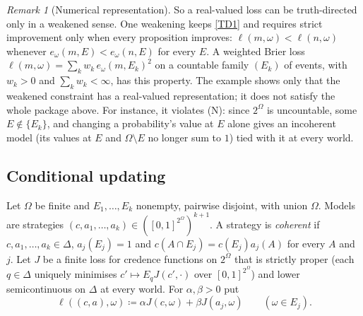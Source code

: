 \documentclass[11pt]{article}
\newenvironment{chgblockb}{\color{red}}{}
\theoremstyle{definition}
\theoremstyle{remark}
\newtheorem{remark}[theorem]{Remark}
\begin{document}
\begin{chgblockb}
\begin{remark}[Numerical representation]
So a real-valued loss can be truth-directed only in a weakened sense. One weakening keeps \ref{TD1} and requires strict improvement only when every proposition improves: $\ell(m,\omega)<\ell(n,\omega)$ whenever $e_\omega(m,E)<e_\omega(n,E)$ for every $E$. A weighted Brier loss $\ell(m,\omega)=\sum_kw_k\,e_\omega(m,E_k)^2$ on a countable family $(E_k)$ of events, with $w_k>0$ and $\sum_kw_k<\infty$, has this property. The example shows only that the weakened constraint has a real-valued representation; it does not satisfy the whole package above. For instance, it violates (N): since $2^\Omega$ is uncountable, some $E\notin\{E_k\}$, and changing a probability's value at $E$ alone gives an incoherent model (its values at $E$ and $\Omega\setminus E$ no longer sum to $1$) tied with it at every world. 
\end{remark}
\end{chgblockb}

\subsection{Conditional updating}

Let $\Omega$ be finite and $E_1,\dots,E_k$ nonempty, pairwise disjoint, with union $\Omega$. Models are strategies $(c,a_1,\dots,a_k)\in([0,1]^{2^\Omega})^{k+1}$. A strategy is \emph{coherent} if $c,a_1,\dots,a_k\in\Delta$, $a_j(E_j)=1$ and $c(A\cap E_j)=c(E_j)a_j(A)$ for every $A$ and $j$. Let $J$ be a finite loss for credence functions on $2^\Omega$ that is strictly proper (each $q\in\Delta$ uniquely minimises $c'\mapsto E_qJ(c',\cdot)$ over $[0,1]^{2^\Omega}$) and lower semicontinuous on $\Delta$ at every world. For $\alpha,\beta>0$ put
\[
\ell((c,a),\omega)\coloneqq\alpha J(c,\omega)+\beta J(a_j,\omega)\qquad(\omega\in E_j).
\]
\end{document}
